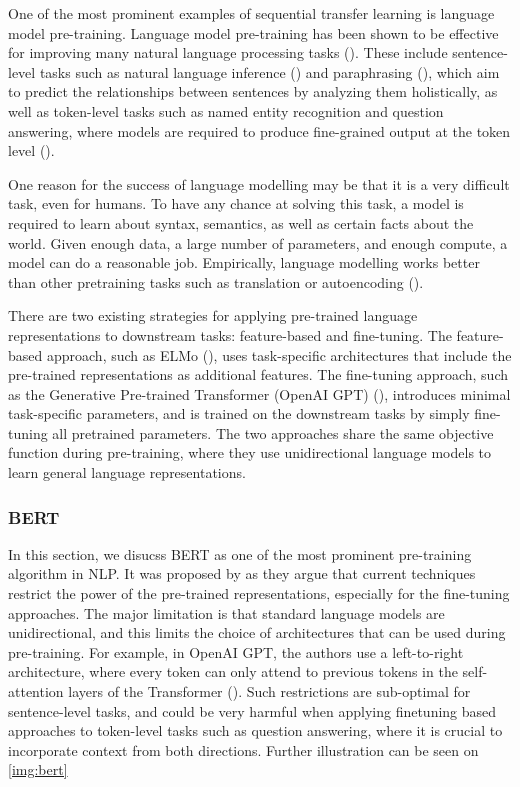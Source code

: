 One of the most prominent examples of sequential transfer learning is language model pre-training.
Language model pre-training has been shown to be effective for improving many natural language processing tasks (\cite{Dai2015SemisupervisedSL,Peters2018DeepCW,Radford2018ImprovingLU,Howard2018UniversalLM}). These include sentence-level tasks such as natural language inference (\cite{Bowman2015ALA,Williams2018ABC}) and paraphrasing (\cite{Dolan2005AutomaticallyCA}), which aim to predict the relationships between sentences by analyzing them holistically, as well as token-level tasks such as named entity recognition and question answering, where models are required to produce fine-grained output at the token level (\cite{Sang2003IntroductionTT,Rajpurkar2016SQuAD1Q}).

One reason for the success of language modelling may be that it is a very difficult task, even for humans. To have any chance at solving this task, a model is required to learn about syntax, semantics, as well as certain facts about the world. Given enough data, a large number of parameters, and enough compute, a model can do a reasonable job. Empirically, language modelling works better than other pretraining tasks such as translation or autoencoding (\cite{Zhang2018LanguageMT,Wang2019CanYT}).

There are two existing strategies for applying pre-trained language representations to downstream tasks: feature-based and fine-tuning. The feature-based approach, such as ELMo (\cite{Peters2018DeepCW}), uses task-specific architectures that include the pre-trained representations as additional features. The fine-tuning approach, such as the Generative Pre-trained Transformer (OpenAI GPT) (\cite{Radford2018ImprovingLU}), introduces minimal task-specific parameters, and is trained on the downstream tasks by simply fine-tuning all pretrained parameters. The two approaches share the same objective function during pre-training, where they use unidirectional language models to learn general language representations.

\subsubsection{BERT}
In this section, we disucss BERT as one of the most prominent pre-training algorithm in NLP. It was proposed by \cite{devlin2018bert} as they argue that current techniques restrict the power of the pre-trained representations, especially for the fine-tuning approaches. The major limitation is that standard language models are unidirectional, and this limits the choice of architectures that can be used during pre-training. For example, in OpenAI GPT, the authors use a left-to-right architecture, where every token can only attend to previous tokens in the self-attention layers of the Transformer (\cite{vaswani2017attention}). Such restrictions are sub-optimal for sentence-level tasks, and could be very harmful when applying finetuning based approaches to token-level tasks such as question answering, where it is crucial to incorporate context from both directions. Further illustration can be seen on \ref{img:bert}

